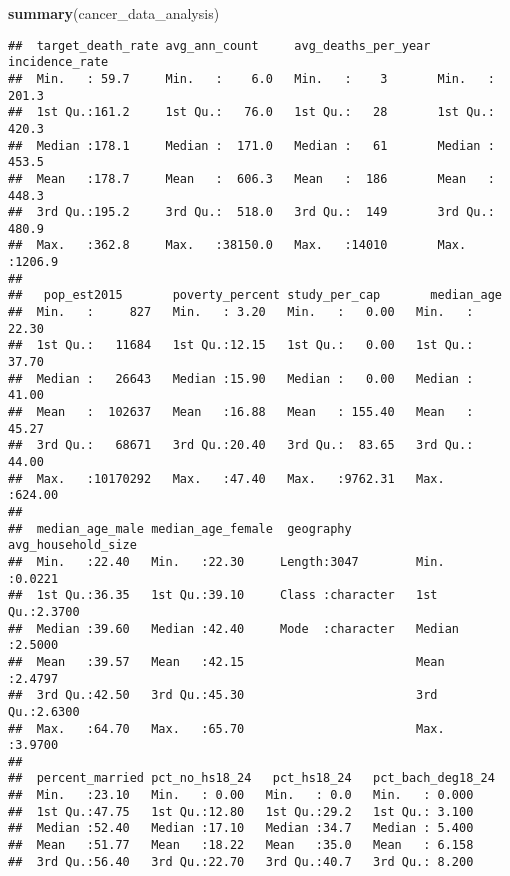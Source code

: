 \documentclass[]{article}
\newenvironment{Shaded}{\begin{snugshade}}{\end{snugshade}}
\newcommand{\KeywordTok}[1]{\textcolor[rgb]{0.13,0.29,0.53}{\textbf{#1}}}
\newcommand{\NormalTok}[1]{#1}
\begin{document}
\begin{Shaded}
\begin{Highlighting}[]
\KeywordTok{summary}\NormalTok{(cancer_data_analysis)}
\end{Highlighting}
\end{Shaded}

\begin{verbatim}
##  target_death_rate avg_ann_count     avg_deaths_per_year incidence_rate  
##  Min.   : 59.7     Min.   :    6.0   Min.   :    3       Min.   : 201.3  
##  1st Qu.:161.2     1st Qu.:   76.0   1st Qu.:   28       1st Qu.: 420.3  
##  Median :178.1     Median :  171.0   Median :   61       Median : 453.5  
##  Mean   :178.7     Mean   :  606.3   Mean   :  186       Mean   : 448.3  
##  3rd Qu.:195.2     3rd Qu.:  518.0   3rd Qu.:  149       3rd Qu.: 480.9  
##  Max.   :362.8     Max.   :38150.0   Max.   :14010       Max.   :1206.9  
##                                                                          
##   pop_est2015       poverty_percent study_per_cap       median_age    
##  Min.   :     827   Min.   : 3.20   Min.   :   0.00   Min.   : 22.30  
##  1st Qu.:   11684   1st Qu.:12.15   1st Qu.:   0.00   1st Qu.: 37.70  
##  Median :   26643   Median :15.90   Median :   0.00   Median : 41.00  
##  Mean   :  102637   Mean   :16.88   Mean   : 155.40   Mean   : 45.27  
##  3rd Qu.:   68671   3rd Qu.:20.40   3rd Qu.:  83.65   3rd Qu.: 44.00  
##  Max.   :10170292   Max.   :47.40   Max.   :9762.31   Max.   :624.00  
##                                                                       
##  median_age_male median_age_female  geography         avg_household_size
##  Min.   :22.40   Min.   :22.30     Length:3047        Min.   :0.0221    
##  1st Qu.:36.35   1st Qu.:39.10     Class :character   1st Qu.:2.3700    
##  Median :39.60   Median :42.40     Mode  :character   Median :2.5000    
##  Mean   :39.57   Mean   :42.15                        Mean   :2.4797    
##  3rd Qu.:42.50   3rd Qu.:45.30                        3rd Qu.:2.6300    
##  Max.   :64.70   Max.   :65.70                        Max.   :3.9700    
##                                                                         
##  percent_married pct_no_hs18_24   pct_hs18_24   pct_bach_deg18_24
##  Min.   :23.10   Min.   : 0.00   Min.   : 0.0   Min.   : 0.000   
##  1st Qu.:47.75   1st Qu.:12.80   1st Qu.:29.2   1st Qu.: 3.100   
##  Median :52.40   Median :17.10   Median :34.7   Median : 5.400   
##  Mean   :51.77   Mean   :18.22   Mean   :35.0   Mean   : 6.158   
##  3rd Qu.:56.40   3rd Qu.:22.70   3rd Qu.:40.7   3rd Qu.: 8.200   

\end{verbatim}
\end{document}
